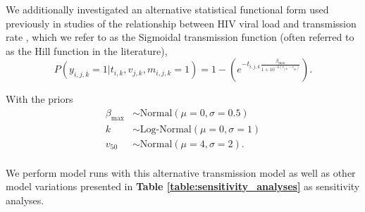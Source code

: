 \documentclass{article}[11pt]
\begin{document}
We additionally investigated an alternative statistical functional form used previously in studies of the relationship between HIV viral load and transmission rate \cite{blanquart2016, fraser2007}, which we refer to as the Sigmoidal transmission function (often referred to as the Hill function in the literature),
\begin{equation}
P(y_{i,j,k}=1|t_{i,k},v_{j,k}, m_{i,j,k}=1) = 1-\left(e^{-t_{i,j,k}\frac{\beta_\text{max}}{1 + 10^{-k\left(v_{j,k}-v_{50}\right)}}}\right).
\end{equation}

With the priors
\begin{align}
\beta_\text{max} &\sim \text{Normal}(\mu=0, \sigma=0.5) \\
k &\sim \text{Log-Normal}(\mu=0, \sigma=1)\\
v_{50} &\sim \text{Normal}(\mu=4,\sigma=2).\\
\end{align}

We perform model runs with this alternative transmission model as well as  other model variations presented in \textbf{Table \ref{table:sensitivity_analyses}} as sensitivity analyses.
\end{document}
